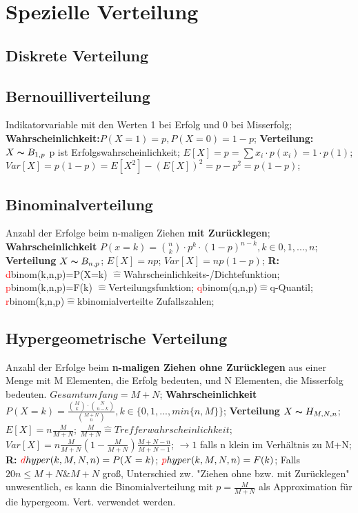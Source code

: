 \section{Spezielle Verteilung}
\subsection{Diskrete Verteilung}
\subsection{Bernouilliverteilung}
Indikatorvariable mit den Werten 1 bei Erfolg und 0 bei Misserfolg;
\textbf{Wahrscheinlichkeit:}$P(X=1) = p, P(X=0)  = 1 - p$; 
\textbf{Verteilung:} $X \thicksim B_{1,p}$ p ist Erfolgswahrscheinlichkeit; 
$E[X] = p = \sum x_{i} \cdot p(x_{i}) = 1 \cdot p(1)$; 
$Var[X] = p(1-p)  = E[X^2] -(E[X])^2 = p - p^2 = p(1-p)$; 
\subsection{Binominalverteilung}
Anzahl der Erfolge beim n-maligen Ziehen \textbf{mit Zurücklegen};
\textbf{Wahrscheinlichkeit} $ P(x = k ) =  \binom{n}{k} \cdot p^k \cdot (1-p)^{n-k}, k \in {0, 1, ..., n}$; 
\textbf{Verteilung} $ X \thicksim B_{n, p}$; 
$E[X] = np$; 
$ Var[X] = np(1-p) $; 
\textbf{R:}
\textcolor{red}{d}binom(k,n,p)=P(X=k) $\hat{=}$Wahrscheinlichkeits-/Dichtefunktion; 
\textcolor{red}{p}binom(k,n,p)=F(k) $\hat{=}$Verteilungsfunktion; 
\textcolor{red}{q}binom(q,n,p)$\hat{=}$q-Quantil; 
\textcolor{red}{r}binom(k,n,p)$\hat{=}$kbinomialverteilte Zufallszahlen; 
\subsection{Hypergeometrische Verteilung}
Anzahl der Erfolge beim \textbf{n-maligen Ziehen ohne Zurücklegen} aus einer Menge mit M Elementen, die Erfolg bedeuten, und N Elementen, die Misserfolg bedeuten. $Gesamtumfang = M + N$;
\textbf{Wahrscheinlichkeit}
$ P(X=k) = \frac{\binom{M}{k} \cdot \binom{N}{n-k}}{\binom{M+N}{n}}, k \in \{0, 1, ..., min\{n,M\}\}$;
\textbf{Verteilung} $ X \thicksim H_{M, N, n}$; $E[X] = n \frac{M}{M+N}$; $\frac{M}{M+N} \hat{=} Trefferwahrscheinlichkeit$; $Var[X] = n \frac{M}{M+N}( 1 - \frac{M}{M+N}) \frac{M+N-n}{M+N-1}$; $\rightarrow 1$ falls n klein im Verhältnis zu M+N;
\textbf{R:}
$\textcolor{red}{d}hyper(k,M,N,n)=P(X=k)$;
$\textcolor{red}{p}hyper(k,M,N,n)=F(k)$;
Falls $ 20n \le M + N \& M + N $ groß, Unterschied zw. "Ziehen ohne bzw. mit Zurücklegen" unwesentlich, es kann die Binomialverteilung mit $ p = \frac{M}{M+N} $ als Approximation für die hypergeom. Vert. verwendet werden.
